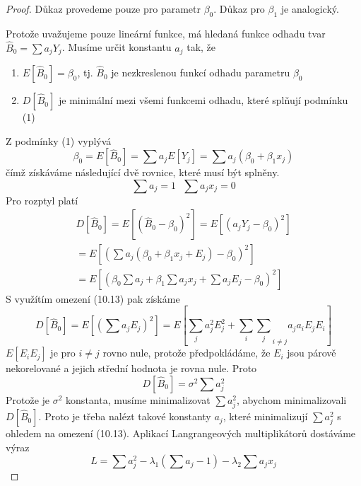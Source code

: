 \begin{proof}
Důkaz provedeme pouze pro parametr $\beta_0$. Důkaz pro $\beta_1$ je analogický.

Protože uvažujeme pouze lineární funkce, má hledaná funkce odhadu tvar $\hat{B}_0 = \sum a_j Y_j$. Musíme určit konstantu $a_j$ tak, že
\begin{enumerate}
\item $E[\hat{B}_0] = \beta_0$, tj. $\hat{B}_0$ je nezkreslenou funkcí odhadu parametru $\beta_0$
\item $D[\hat{B}_0]$ je minimální mezi všemi funkcemi odhadu, které splňují podmínku (1) 
\end{enumerate}
Z podmínky (1) vyplývá
\begin{equation*}
\beta_0 = E[\hat{B}_0] = \sum a_j E[Y_j] = \sum a_j(\beta_0 + \beta_1 x_j)
\end{equation*}
čímž získáváme následující dvě rovnice, které musí být splněny.
\begin{equation}
\sum a_j = 1 ~~~ \sum a_j x_j = 0
\end{equation}
Pro rozptyl platí
\begin{multline*}
D[\hat{B}_0] = E[(\hat{B}_0 - \beta_0)^2] = E\left[\left(a_j Y_j - \beta_0 \right)^2\right]\\
= E\left[\left(\sum a_j(\beta_0 + \beta_1x_j + E_j) - \beta_0 \right)^2 \right]\\
= E\left[(\beta_0 \sum a_j + \beta_1 \sum a_j x_j + \sum a_j E_j - \beta_0)^2 \right]
\end{multline*}
S využítím omezení (10.13) pak získáme
\begin{equation*}
D[\hat{B}_0] = E\left[\left(\sum a_j E_j\right)^2\right] = E \left[\sum_j a_j^2 E_j^2 + {\sum_i \sum_j}_{i \neq j} a_j a_i E_j E_i\right]
\end{equation*}
$E[E_iE_j]$ je pro $i \neq j$ rovno nule, protože předpokládáme, že $E_i$ jsou párově nekorelované a jejich střední hodnota je rovna nule. Proto
\begin{equation*}
D[\hat{B}_0] = \sigma^2 \sum a_j^2
\end{equation*}
Protože je $\sigma^2$ konstanta, musíme minimalizovat $\sum a_j^2$, abychom minimalizovali $D[\hat{B}_0]$. Proto je třeba nalézt takové konstanty $a_j$, které minimalizují $\sum a_j^2$ s ohledem na omezení (10.13). Aplikací Langrangeových multiplikátorů dostáváme výraz
\begin{equation*}
L = \sum a^2_j - \lambda_1\left(\sum a_j - 1 \right) - \lambda_2 \sum a_j x_j
\end{equation*}

\end{proof}
